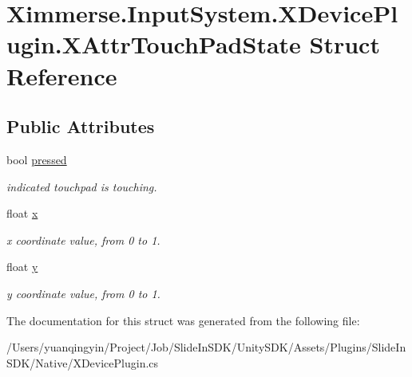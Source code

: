 \hypertarget{struct_ximmerse_1_1_input_system_1_1_x_device_plugin_1_1_x_attr_touch_pad_state}{}\section{Ximmerse.\+Input\+System.\+X\+Device\+Plugin.\+X\+Attr\+Touch\+Pad\+State Struct Reference}
\label{struct_ximmerse_1_1_input_system_1_1_x_device_plugin_1_1_x_attr_touch_pad_state}
\subsection*{Public Attributes}
\begin{DoxyCompactItemize}
\item 
\mbox{\label{struct_ximmerse_1_1_input_system_1_1_x_device_plugin_1_1_x_attr_touch_pad_state_a4667ba77f48969a0223c0af828131e5d}} 
bool \mbox{\hyperlink{struct_ximmerse_1_1_input_system_1_1_x_device_plugin_1_1_x_attr_touch_pad_state_a4667ba77f48969a0223c0af828131e5d}{pressed}}
\begin{DoxyCompactList}\small\item\em indicated touchpad is touching. \end{DoxyCompactList}\item 
\mbox{\label{struct_ximmerse_1_1_input_system_1_1_x_device_plugin_1_1_x_attr_touch_pad_state_afbbf739d2b73575d79d9af5f38054095}} 
float \mbox{\hyperlink{struct_ximmerse_1_1_input_system_1_1_x_device_plugin_1_1_x_attr_touch_pad_state_afbbf739d2b73575d79d9af5f38054095}{x}}
\begin{DoxyCompactList}\small\item\em x coordinate value, from 0 to 1. \end{DoxyCompactList}\item 
\mbox{\label{struct_ximmerse_1_1_input_system_1_1_x_device_plugin_1_1_x_attr_touch_pad_state_a758c71d97febdab33ab8356af7057e83}} 
float \mbox{\hyperlink{struct_ximmerse_1_1_input_system_1_1_x_device_plugin_1_1_x_attr_touch_pad_state_a758c71d97febdab33ab8356af7057e83}{y}}
\begin{DoxyCompactList}\small\item\em y coordinate value, from 0 to 1. \end{DoxyCompactList}\end{DoxyCompactItemize}


The documentation for this struct was generated from the following file\+:\begin{DoxyCompactItemize}
\item 
/\+Users/yuanqingyin/\+Project/\+Job/\+Slide\+In\+S\+D\+K/\+Unity\+S\+D\+K/\+Assets/\+Plugins/\+Slide\+In\+S\+D\+K/\+Native/X\+Device\+Plugin.\+cs\end{DoxyCompactItemize}
